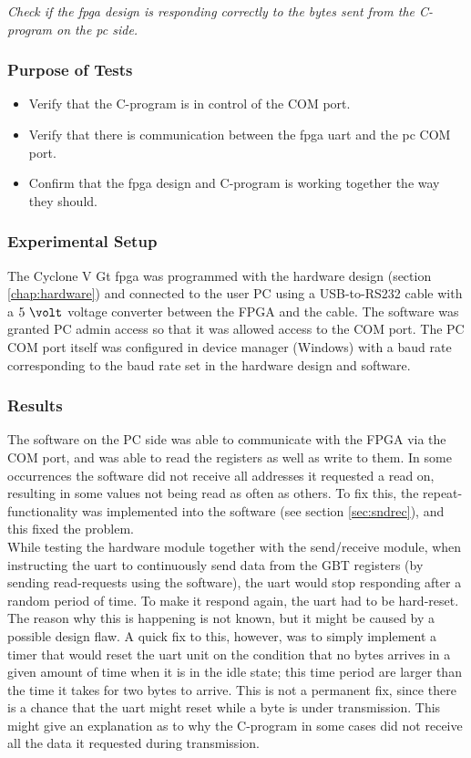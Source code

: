 \documentclass[main.tex]{subfiles}
\begin{document}
\textit{Check if the \gls{fpga} design is responding correctly to the bytes sent from the C-program on the \gls{pc} side.} 

\subsubsection{Purpose of Tests}
\begin{itemize}\setlength{\itemsep}{10pt}
\item Verify that the C-program is in control of the COM port.
\item Verify that there is communication between the \gls{fpga} \gls{uart} and the \gls{pc} COM port.
\item Confirm that the \gls{fpga} design and C-program is working together the way they should.
\end{itemize}

\subsubsection{Experimental Setup}

The Cyclone V Gt \gls{fpga} was programmed with the hardware design (section \ref{chap:hardware}) and connected to the user PC using a USB-to-RS232 cable with a $5~\volt$ voltage converter between the FPGA and the cable. The software was granted PC admin access so that it was allowed access to the COM port. The PC COM port itself was configured in device manager (Windows) with a baud rate corresponding to the baud rate set in the hardware design and software. 

\subsubsection{Results}

The software on the PC side was able to communicate with the FPGA via the COM port, and was able to read the registers as well as write to them. In some occurrences the software did not receive all addresses it requested a read on, resulting in some values not being read as often as others. To fix this, the repeat-functionality was implemented into the software (see section \ref{sec:sndrec}), and this fixed the problem.\\

While testing the hardware module together with the send/receive module, when instructing the \gls{uart} to continuously send data from the GBT registers (by sending read-requests using the software), the \gls{uart} would stop responding after a random period of time. To make it respond again, the \gls{uart} had to be hard-reset. The reason why this is happening is not known, but it might be caused by a possible design flaw. A quick fix to this, however, was to simply implement a timer that would reset the \gls{uart} unit on the condition that no bytes arrives in a given amount of time when it is in the idle state; this time period are larger than the time it takes for two bytes to arrive. This is not a permanent fix, since there is a chance that the \gls{uart} might reset while a byte is under transmission. This might give an explanation as to why the C-program in some cases did not receive all the data it requested during transmission.
\end{document}
